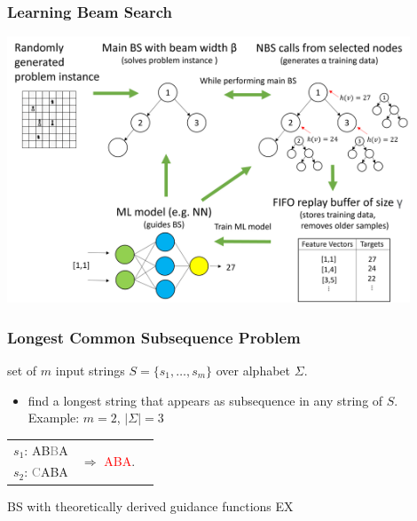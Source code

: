 \documentclass[aspectratio=1610]{beamer}
\begin{document}
	
\begin{frame}
\frametitle{Learning Beam Search \citep{huber-21}}
	\begin{center}
		\includegraphics[height=225pt]{graphics/lbsProcedure.png}
	\end{center}
\end{frame}
	
\begin{frame}%
	\frametitle{Longest Common Subsequence Problem}
	
	\medskip
	
	 set of $m$ input strings $S = \{s_1 , \ldots, s_m \}$ over alphabet $\Sigma$.
	
	\medskip
	
	\begin{itemize}
		\item {} find a longest string that appears as subsequence in any string of $S$. \\ \medskip
		Example: $m=2$, $|\Sigma|=3$
	\end{itemize}
	\begin{center}
	\begin{tabular}{ccc}
		$s_1$: AB\textcolor{gray}{B}A & \multirow{2}{*}{$\Rightarrow$ \textcolor{red}{ABA}.}\\
		$s_2$: \textcolor{gray}{C}ABA
	\end{tabular}
	\end{center}
	

	\bigskip
	 BS with theoretically derived guidance functions EX\\ \citep{djukanovic-19b}
\end{frame}
\end{document}
